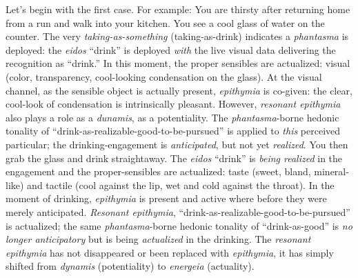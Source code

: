 \documentclass{article}
\begin{document}
Let's begin with the first case. For example: You are thirsty after returning home from a run and walk into your kitchen. You see a cool glass of water on the counter. The very \textit{taking-as-something} (taking-as-drink) indicates a \textit{phantasma} is deployed: the \textit{eidos} ``drink'' is deployed \textit{with} the live visual data delivering the recognition as ``drink.'' In this moment, the proper sensibles are actualized: visual (color, transparency, cool-looking condensation on the glass). At the visual channel, as the sensible object is actually present, \textit{epithymia} is co-given: the clear, cool-look of condensation is intrinsically pleasant. However, \textit{resonant epithymia} also plays a role as a \textit{dunamis}, as a potentiality. The \textit{phantasma}-borne hedonic tonality of ``drink-as-realizable-good-to-be-pursued'' is applied to \textit{this} perceived particular; the drinking-engagement is \textit{anticipated}, but not yet \textit{realized}. You then grab the glass and drink straightaway. The \textit{eidos} ``drink'' is \textit{being realized} in the engagement and the proper-sensibles are actualized: taste (sweet, bland, mineral-like) and tactile (cool against the lip, wet and cold against the throat). In the moment of drinking, \textit{epithymia} is present and active where before they were merely anticipated. \textit{Resonant epithymia}, ``drink-as-realizable-good-to-be-pursued'' is actualized; the same \textit{phantasma}-borne hedonic tonality of ``drink-as-good'' is \textit{no longer anticipatory} but is being \textit{actualized} in the drinking. The \textit{resonant epithymia} has not disappeared or been replaced with \textit{epithymia}, it has simply shifted from \textit{dynamis} (potentiality) to \textit{energeia} (actuality). 
\end{document}
